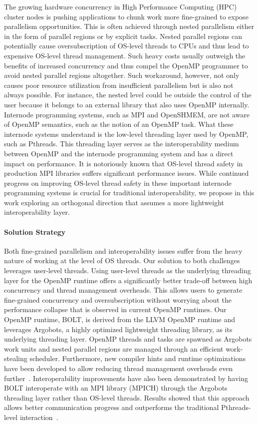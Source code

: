 The growing hardware concurrency in High Performance Computing (HPC)
cluster nodes is pushing applications to chunk work more fine-grained
to expose parallelism opportunities.  This is often achieved through
nested parallelism either in the form of parallel regions or by
explicit tasks.  Nested parallel regions can potentially cause
oversubscription of OS-level threads to CPUs and thus lead to
expensive OS-level thread management.  Such heavy costs usually
outweigh the benefits of increased concurrency and thus compel the
OpenMP programmer to avoid nested parallel regions altogether.  Such
workaround, however, not only causes poor resource utilization from
insufficient parallelism but is also not always possible.  For
instance, the nested level could be outside the control of the user
because it belongs to an external library that also uses OpenMP
internally.  Internode programming systems, such as MPI and OpenSHMEM,
are not aware of OpenMP semantics, such as the notion of an OpenMP
task.  What these internode systems understand is the low-level
threading layer used by OpenMP, such as Pthreads.  This threading
layer serves as the interoperability medium between OpenMP and the
internode programming system and has a direct impact on performance.
It is notoriously known that OS-level thread safety in production MPI
libraries suffers significant performance issues. While continued
progress on improving OS-level thread safety in these important
internode programming systems is crucial for traditional
interoperability, we propose in this work exploring an orthogonal
direction that assumes a more lightweight interoperability layer.

\paragraph{Solution Strategy}

Both fine-grained parallelism and interoperability issues suffer from
the heavy nature of working at the level of OS threads.  Our solution
to both challenges leverages user-level threads.  Using user-level
threads as the underlying threading layer for the OpenMP runtime
offers a significantly better trade-off between high concurrency and
thread management overheads.  This allows users to generate
fine-grained concurrency and oversubscription without worrying about
the performance collapse that is observed in current OpenMP runtimes.
Our OpenMP runtime, BOLT, is derived from the LLVM OpenMP runtime and
leverages Argobots, a highly optimized lightweight threading library,
as its underlying threading layer.  OpenMP threads and tasks are
spawned as Argobots work units and nested parallel regions are managed
through an efficient work-stealing scheduler.  Furthermore, new
compiler hints and runtime optimizations have been developed to allow
reducing thread management overheads even further~\cite{iwasaki2018}.
Interoperability improvements have also been demonstrated by having
BOLT interoperate with an MPI library (MPICH) through the Argobots
threading layer rather than OS-level threads.  Results showed that
this approach allows better communication progress and outperforms the
traditional Pthreads-level interaction~\cite{seo2018}.

